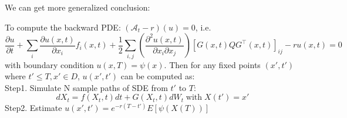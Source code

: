 We can get more generalized conclusion:
\begin{algorithm}

    To compute the backward PDE: $(\mathcal{A}_t-r)(u)=0$, i.e.
    \begin{equation}
        \frac{\partial u}{\partial t} + \sum_{i} \frac{\partial u(x, t)}{\partial x_{i}} f_{i}(x, t)+\frac{1}{2} \sum_{i, j}\left(\frac{\partial^{2}u(x, t)}{\partial x_{i} \partial x_{j}}\right)\left[G(x, t)Q G^{\top}(x, t)\right]_{i j} - ru(x, t)=0
    \end{equation}
    with boundary condition $u(x, T)=\psi(x)$. Then for any fixed points $(x', t')$ where $t'\leq T, x'\in D$, $u(x', t')$ can be computed as:\\
    Step1. Simulate N sample paths of SDE from $t'$ to $T$:
    \begin{equation}
        dX_t=f(X_t, t)dt + G(X_t, t)dW_t\operatorname{with}X(t')=x'
    \end{equation}
    Step2. Estimate $u(x', t') = e^{-r(T-t')}E\left[\psi(X(T))\right]$
\end{algorithm}

